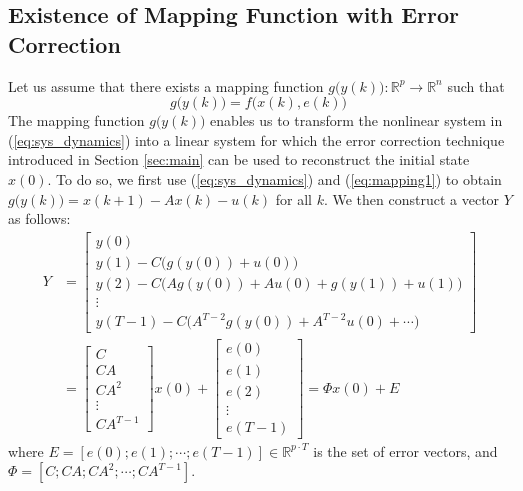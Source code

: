 \subsection{Existence of Mapping Function with Error Correction}\label{map_1}
Let us assume that there exists a mapping function $g\big(y(k)\big): \mathbb{R}^p \rightarrow \mathbb{R}^n$ such that
\begin{equation}\label{eq:mapping1}
g\big(y(k)\big)=f\big(x(k),e(k)\big)~
\end{equation}
The mapping function $g\big(y(k)\big)$ enables us to transform the nonlinear system in (\ref{eq:sys_dynamics}) into a linear system for which the error correction technique introduced in Section \ref{sec:main} can be used to reconstruct the initial state $x(0)$. To do so, we first use (\ref{eq:sys_dynamics}) and (\ref{eq:mapping1}) to obtain $g\big(y(k)\big)=x(k+1)-A x(k)-u(k)$ for all $k$. We then construct a vector $Y$ as follows:
\begin{equation}\label{map_1_error_correction}
\begin{aligned}
	Y&=\begin{bmatrix} y(0) \\ y(1) - C \big(g(y(0))+ u(0)\big)  \\
	y(2) - C \big( A g(y(0)) + A u(0) + g(y(1) ) + u(1) \big) \\ \vdots   \\
	y(T-1) - C \big(A^{T-2} g(y(0)) + A^{T-2} u(0) + \cdots \big) \end{bmatrix}
	\\&= \begin{bmatrix} C \\ CA \\ CA^2 \\  \vdots \\ CA^{T-1}  \end{bmatrix} x(0) + \begin{bmatrix} e(0) \\ e(1) \\ e(2) \\ \vdots  \\ e(T-1)\end{bmatrix} = \Phi x(0) + E
\end{aligned}
\end{equation}
where $E=[e(0);e(1);\cdots;e(T-1)]\in \mathbb{R}^{p \cdot T}$ is the set of error vectors, and $\Phi=[C;CA;CA^2;\cdots;CA^{T-1}]$.

